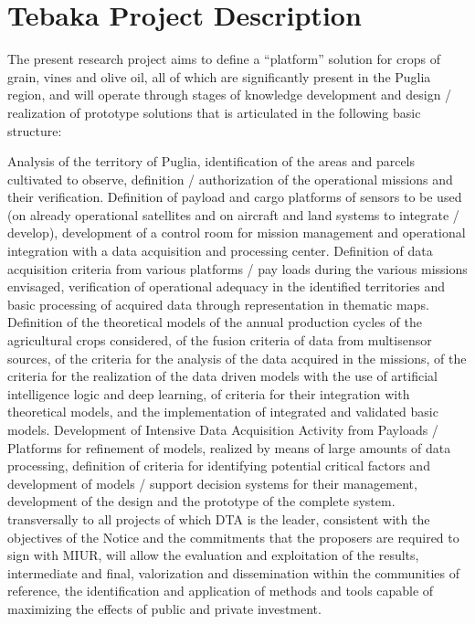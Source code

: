 \documentclass[conference]{IEEEtran}
\begin{document}
\lipsum[2-8]

\section{Tebaka Project Description}

The present research project aims to define a “platform” solution for crops of grain, vines and olive oil, all of which are significantly present in the Puglia region, and will operate through stages of knowledge development and design / realization of prototype solutions that is articulated in the following basic structure:

Analysis of the territory of Puglia, identification of the areas and parcels cultivated to observe, definition / authorization of the operational missions and their verification.
Definition of payload and cargo platforms of sensors to be used (on already operational satellites and on aircraft and land systems to integrate / develop), development of a control room for mission management and operational integration with a data acquisition and processing center.
Definition of data acquisition criteria from various platforms / pay loads during the various missions envisaged, verification of operational adequacy in the identified territories and basic processing of acquired data through representation in thematic maps.
Definition of the theoretical models of the annual production cycles of the agricultural crops considered, of the fusion criteria of data from multisensor sources, of the criteria for the analysis of the data acquired in the missions, of the criteria for the realization of the data driven models with the use of artificial intelligence logic and deep learning, of criteria for their integration with theoretical models, and the implementation of integrated and validated basic models.
Development of Intensive Data Acquisition Activity from Payloads / Platforms for refinement of models, realized by means of large amounts of data processing, definition of criteria for identifying potential critical factors and development of models / support decision systems for their management, development of the design and the prototype of the complete system.
transversally to all projects of which DTA is the leader, consistent with the objectives of the Notice and the commitments that the proposers are required to sign with MIUR, will allow the evaluation and exploitation of the results, intermediate and final, valorization and dissemination within the communities of reference, the identification and application of methods and tools capable of maximizing the effects of public and private investment.
 
\end{document}
